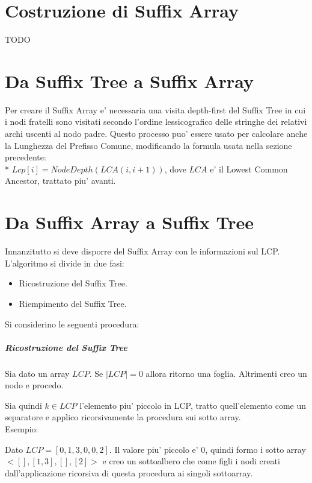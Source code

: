 \section{Costruzione di Suffix Array}

TODO

\section{Da Suffix Tree a Suffix Array}

Per creare il Suffix Array e' necessaria una visita depth-first del Suffix Tree in cui i nodi fratelli sono visitati secondo l'ordine lessicografico delle stringhe dei relativi archi uscenti al nodo padre.
Questo processo puo' essere usato per calcolare anche la Lunghezza del Prefisso Comune, modificando la formula usata nella sezione precedente: \\*
$Lcp[i] = NodeDepth(LCA(i, i+1))$, dove $LCA$ e' il Lowest Common Ancestor, trattato piu' avanti.

\section{Da Suffix Array a Suffix Tree}

Innanzitutto si deve disporre del Suffix Array con le informazioni sul LCP.
L'algoritmo si divide in due fasi: 

\begin{itemize}
\item Ricostruzione del Suffix Tree.
\item Riempimento del Suffix Tree.
\end{itemize}

Si considerino le seguenti procedura:

\subparagraph{Ricostruzione del Suffix Tree}

Sia dato un array $LCP$.
Se $|LCP| = 0$ allora ritorno una foglia.
Altrimenti creo un nodo e procedo.

Sia quindi $k \in LCP$ l'elemento piu' piccolo in LCP, tratto quell'elemento come un separatore e applico ricorsivamente la procedura sui sotto array. \\

Esempio:

Dato $LCP = [0, 1, 3, 0, 0, 2]$. Il valore piu' piccolo e' $0$, quindi formo i sotto array $<[], [1,3], [], [2]>$ e creo un sottoalbero che come figli i nodi creati dall'applicazione ricorsiva di questa procedura ai singoli sottoarray.

